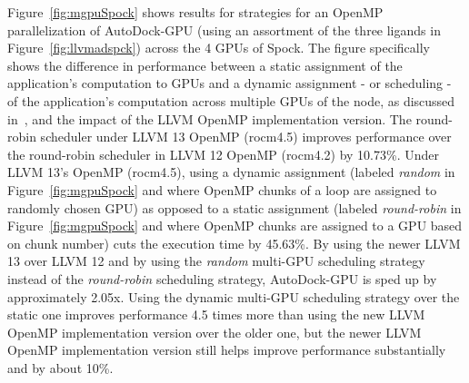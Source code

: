 Figure~\ref{fig:mgpuSpock} shows results for strategies for an OpenMP parallelization of AutoDock-GPU (using an assortment of the three ligands in Figure~\ref{fig:llvmadspck}) across the 4 GPUs of Spock. The figure specifically shows the difference in performance between a static assignment of the application's computation to GPUs and a dynamic assignment - or scheduling - of the application's computation across multiple GPUs of the node, as discussed in~\cite{9669317}, and the impact of the LLVM OpenMP implementation version. The round-robin scheduler under LLVM 13 OpenMP (rocm4.5) improves performance over the round-robin scheduler in LLVM 12 OpenMP (rocm4.2) by 10.73\%. Under LLVM 13’s OpenMP (rocm4.5), using a dynamic assignment (labeled \textit{random} in Figure~\ref{fig:mgpuSpock} and where OpenMP chunks of a loop are assigned to randomly chosen GPU) as opposed to a static assignment (labeled \textit{round-robin} in Figure~\ref{fig:mgpuSpock} and where OpenMP chunks are assigned to a GPU based on chunk number) cuts the execution time by 45.63\%. By using the newer LLVM 13 over LLVM 12 and by using the \textit{random} multi-GPU scheduling strategy instead of the \textit{round-robin} scheduling strategy, AutoDock-GPU is sped up by approximately 2.05x. Using the dynamic multi-GPU scheduling strategy over the static one improves performance 4.5 times more than using the new LLVM OpenMP implementation version over the older one, but the newer LLVM OpenMP implementation version still helps improve performance substantially and by about 10\%. 
